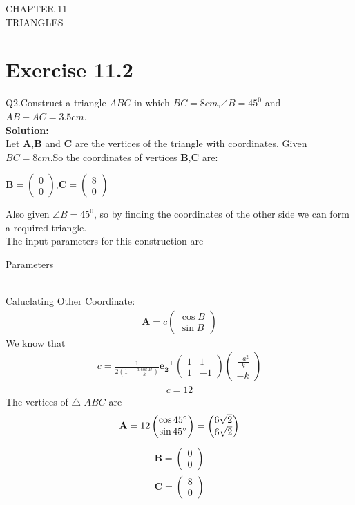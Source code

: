 \documentclass{article}
\newcommand{\myvec}[1]{\ensuremath{\begin{pmatrix}#1\end{pmatrix}}}
\let\vec\mathbf
\begin{document}
\begin{center}
        \textbf\large{CHAPTER-11 \\ TRIANGLES}
\end{center}
\section{Exercise 11.2}
Q2.Construct a triangle $ABC$ in which $BC=8cm$,$\angle{B}=45^0$ and $AB-AC=3.5cm$. \\
\textbf{Solution:}\\
Let $\vec{A}$,$\vec{B}$ and $\vec{C}$ are the vertices of the triangle with coordinates.
Given $BC=8cm$.So the coordinates of vertices $\vec{B}$,$\vec{C}$ are:
\begin{center}
{
$\vec{B} =\myvec{0\\0}$,$\vec{C} =\myvec{8\\0}$
}
\end{center}
Also given $\angle{B}=45^0$, so by finding the coordinates of the other side we can form a required triangle. \\
 The input parameters for this construction are
 \begin{table}[h]
	  \centering
	  
	  \caption{Parameters}
	  \label{tab:Table1}
\end{table}\\
Caluclating Other Coordinate:
  \begin{align}
	  \vec{A} = c\myvec{\cos{B}\\\sin{B}}
	  \end{align}
We know that\\
\begin{align}  
      c = \frac{1}{2(1-\frac{a\cos{B}}{k})}\vec{e_2}^{\top}\myvec{1 & 1\\1 & -1}\myvec{\frac{-a^2}{k}\\-k}
     \end{align}
  \begin{align}
	 c = 12
      \end{align}		
The vertices of $\triangle$ $ABC$ are \\
\begin{align}
\vec{A} = 12\myvec{\cos 45\degree\\\sin 45\degree}
	 = \myvec{6\sqrt{2}\\6\sqrt{2}}
\end{align}
\begin{align}
 \vec{B} = \myvec{0\\0}\\
 \vec{C} = \myvec{8\\0}
 \end{align} 	      
\end{document}
